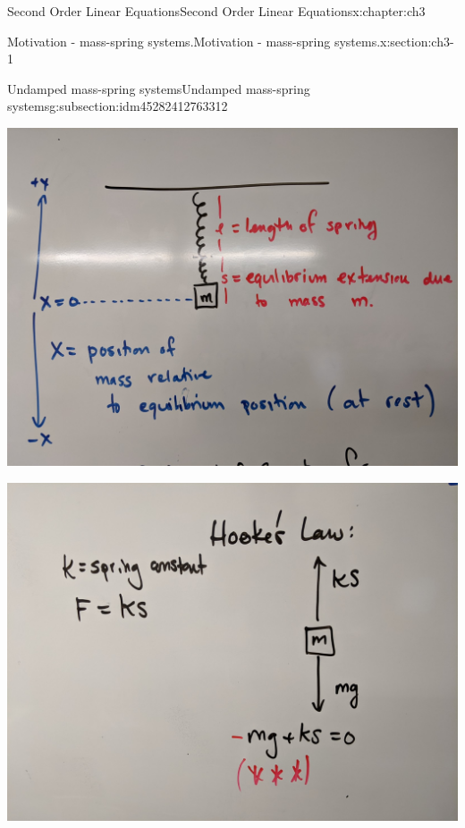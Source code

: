 \documentclass[oneside,10pt,]{book}
\numberwithin{equation}{section}
\numberwithin{equation}{section}
\begin{document}
\begin{chapterptx}{Second Order Linear Equations}{}{Second Order Linear Equations}{}{}{x:chapter:ch3}
\begin{sectionptx}{Motivation - mass-spring systems.}{}{Motivation - mass-spring systems.}{}{}{x:section:ch3-1}
\begin{subsectionptx}{Undamped mass-spring systems}{}{Undamped mass-spring systems}{}{}{g:subsection:idm45282412763312}
\begin{image}{0}{1}{0}
\end{image}%
\begin{image}{0}{1}{0}%
\includegraphics[width=\linewidth]{images/spring_eq.jpg}
\end{image}%
\begin{image}{0}{1}{0}%
\includegraphics[width=\linewidth]{images/hookes.jpg}
\end{image}%
\begin{image}{0}{1}{0}%

\end{image}
\end{subsectionptx}
\end{sectionptx}
\end{chapterptx}
\end{document}
